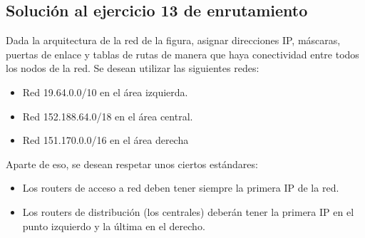 \documentclass[letterpaper,10pt,spanish]{sphinxmanual}
\begin{document}
\subsection{Solución al ejercicio 13 de enrutamiento}
\label{\detokenize{t2_integracion_elementos/ejercicios_subredes_ipv4/ejercicios_dos_router:solucion-al-ejercicio-13-de-enrutamiento}}
\sphinxAtStartPar
Dada la arquitectura de la red de la figura, asignar direcciones IP, máscaras, puertas de enlace y tablas de rutas de manera que haya conectividad entre todos
los nodos de la red. Se desean utilizar las siguientes redes:
\begin{itemize}
\item {} 
\sphinxAtStartPar
Red 19.64.0.0/10 en el área izquierda.

\item {} 
\sphinxAtStartPar
Red 152.188.64.0/18 en el área central.

\item {} 
\sphinxAtStartPar
Red 151.170.0.0/16 en el área derecha

\end{itemize}

\begin{figure}[htbp]
\centering

\noindent{}
\end{figure}

\sphinxAtStartPar
Aparte de eso, se desean respetar unos ciertos estándares:
\begin{itemize}
\item {} 
\sphinxAtStartPar
Los routers de acceso a red deben tener siempre la primera IP de la red.

\item {} 
\sphinxAtStartPar
Los routers de distribución (los centrales) deberán tener la primera IP en el punto izquierdo y la última en el derecho.

\end{itemize}
\end{document}
